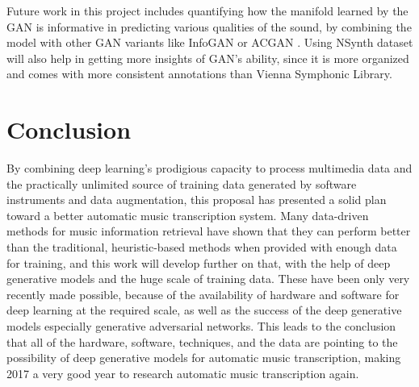 Future work in this project includes quantifying how the manifold learned by the GAN is informative in predicting various qualities of the sound, by combining the model with other GAN variants like InfoGAN \cite{chen2016infogan} or ACGAN \cite{odena2016acgan}.
Using NSynth dataset will also help in getting more insights of GAN's ability, since it is more organized and comes with more consistent annotations than Vienna Symphonic Library.






\section{Conclusion}\label{sec:summary}

By combining deep learning's prodigious capacity to process multimedia data and the practically unlimited source of training data generated by software instruments and data augmentation, this proposal has presented a solid plan toward a better automatic music transcription system.
Many data-driven methods for music information retrieval have shown that they can perform better than the traditional, heuristic-based methods when provided with enough data for training, and this work will develop further on that, with the help of deep generative models and the huge scale of training data.
These have been only very recently made possible, because of the availability of hardware and software for deep learning at the required scale, as well as the success of the deep generative models especially generative adversarial networks.
This leads to the conclusion that all of the hardware, software, techniques, and the data are pointing to the possibility of deep generative models for automatic music transcription, making 2017 a very good year to research automatic music transcription again.

